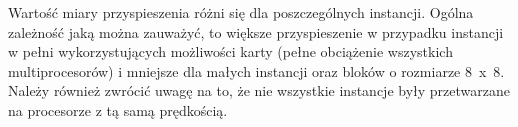 \documentclass[12pt,a4paper]{article}
\begin{document}
Wartość miary przyspieszenia różni się dla poszczególnych instancji. Ogólna zależność jaką można zauważyć, to większe przyspieszenie w przypadku instancji w pełni wykorzystujących możliwości karty (pełne obciążenie wszystkich multiprocesorów) i mniejsze dla małych instancji oraz bloków o rozmiarze 8~x~8. Należy również zwrócić uwagę na to, że nie wszystkie instancje były przetwarzane na procesorze z tą samą prędkością.
\end{document}
